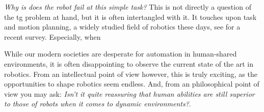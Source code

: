\textit{Why is does the robot fail at this simple task?} This is not directly a
question of the \ac{tg} problem at hand, but it is often intertangled with it.
It touches upon task and motion planning, a widely studied field of robotics
these days, see \cite{garrett2021integrated} for a recent survey. Especially,
when 


While our modern societies are desperate for automation in human-shared
environments, it is often disappointing to observe the current state of the art
in robotics. From an intellectual point of view however, this is truly exciting,
as the opportunities to shape robotics seem endless. And, from an philosophical
point of view you may ask: \textit{Isn't it quite reassuring that human
abilities are still superior to those of robots when it comes to dynamic
environments?}.
